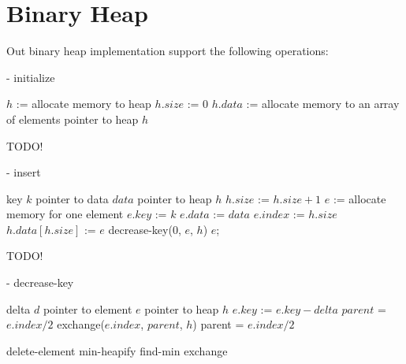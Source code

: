 \section*{Binary Heap}
Out binary heap implementation support the following operations:
\begin{algorithm}
\caption{ - initialize}\label{alg:bin-init}
\begin{algorithmic}[1]
\STATE $h$ := allocate memory to heap
\STATE $h.size$ := 0
\STATE $h.data$ := allocate memory to an array of elements
\RETURN pointer to heap $h$
\end{algorithmic}
\end{algorithm}

TODO!

\begin{algorithm}
\caption{ - insert}\label{alg:bin-ins}
\begin{algorithmic}[1]
\REQUIRE key $k$
\REQUIRE pointer to data $data$
\REQUIRE pointer to heap $h$
\STATE $h.size$ := $h.size + 1$
\STATE $e$ := allocate memory for one element
\STATE $e.key$ := $k$
\STATE $e.data$ := $data$
\STATE $e.index$ := $h.size$
\STATE $h.data[h.size]$ := $e$
\STATE decrease-key($0$, $e$, $h$)
\RETURN $e$;
\end{algorithmic}
\end{algorithm}

TODO!

\begin{algorithm}
\caption{ - decrease-key}\label{alg:bin-dk}
\begin{algorithmic}[1]
\REQUIRE delta $d$
\REQUIRE pointer to element $e$
\REQUIRE pointer to heap $h$
\STATE $e.key$ := $e.key - delta$
\STATE $parent$ = $e.index / 2$
    \STATE exchange($e.index$, $parent$, $h$)
    \STATE parent = $e.index / 2$
\ENDWHILE
\end{algorithmic}
\end{algorithm}

delete-element
min-heapify
find-min
exchange